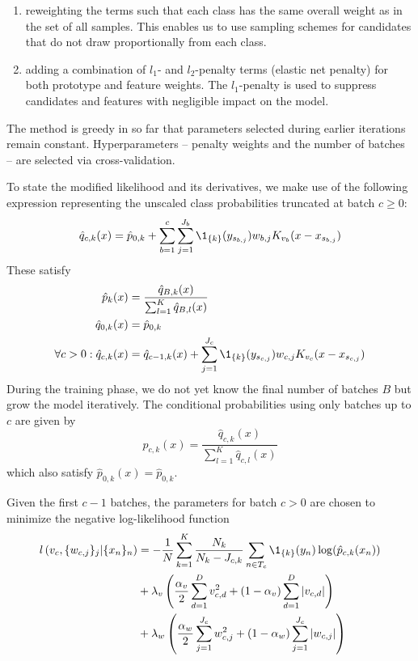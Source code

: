 %
\begin{enumerate}
\item reweighting the terms such that each class has the same overall weight as in the set of all samples.
This enables us to use sampling schemes for candidates that do not draw proportionally from each class.
%
\item adding a combination of $l_1$- and $l_2$-penalty terms (elastic net penalty) for both prototype and feature weights.
The $l_1$-penalty is used to suppress candidates and features with negligible impact on the model.
\end{enumerate}
%
The method is greedy in so far that parameters selected during earlier iterations remain constant.
Hyperparameters -- penalty weights and the number of batches -- are selected via cross-validation.\par
%
To state the modified likelihood and its derivatives, we make use of the following expression representing the unscaled class probabilities truncated at batch $c\geq0$:
%
\begin{equation}
\hat{q}_{c,k}(x)=\hat{p}_{0,k}
+\sum_{b=1}^c\sum_{j=1}^{J_b}\1_{\{k\}}(y_{s_{b,j}})w_{b,j}K_{v_b}(x-x_{s_{b,j}})
\label{eq_qckx}
\end{equation}
%
These satisfy
%
\begin{align}
\hat{p}_{k}(x)&=\frac{\hat{q}_{B,k}(x)}{\sum_{l=1}^K\hat{q}_{B,l}(x)}\label{eq_q_properties}\\
\hat{q}_{0,k}(x)&=\hat{p}_{0,k}\notag\\
\forall c>0:\hat{q}_{c,k}(x)&
=\hat{q}_{c-1,k}(x)+\sum_{j=1}^{J_c}\1_{\{k\}}(y_{s_{c,j}})w_{c,j}K_{v_c}(x-x_{s_{c,j}})
\notag
\end{align}
%
During the training phase, we do not yet know the final number of batches $B$ but grow the model iteratively.
The conditional probabilities using only batches up to $c$ are given by
%
\begin{equation}
\hat{p}_{c,k}(x)=\frac{\hat{q}_{c,k}(x)}{\sum_{l=1}^K\hat{q}_{c,l}(x)}\label{eq_pckx}
\end{equation}
%
which also satisfy $\hat{p}_{0,k}(x)=\hat{p}_{0,k}$.\par
%
Given the first $c-1$ batches, the parameters for batch $c>0$ are chosen to minimize the negative log-likelihood function
%
\begin{align}
l\left(v_c,\{w_{c,j}\}_j|\{x_n\}_n\right)
&=-\frac{1}{N}\sum_{k=1}^K\frac{N_k}{N_k-J_{c,k}}\sum_{n\in T_c}
\1_{\{k\}}(y_n)\log(\hat{p}_{c,k}(x_n))\label{eq_log_likelihood}\\
&+\lambda_v\left(\frac{\alpha_v}{2}\sum_{d=1}^Dv_{c,d}^2
+(1-\alpha_v)\sum_{d=1}^D|v_{c,d}|\right)\notag\\
&+\lambda_w\left(\frac{\alpha_w}{2}\sum_{j=1}^{J_c}w_{c,j}^2
+(1-\alpha_w)\sum_{j=1}^{J_c}|w_{c,j}|\right)\notag
\end{align}
